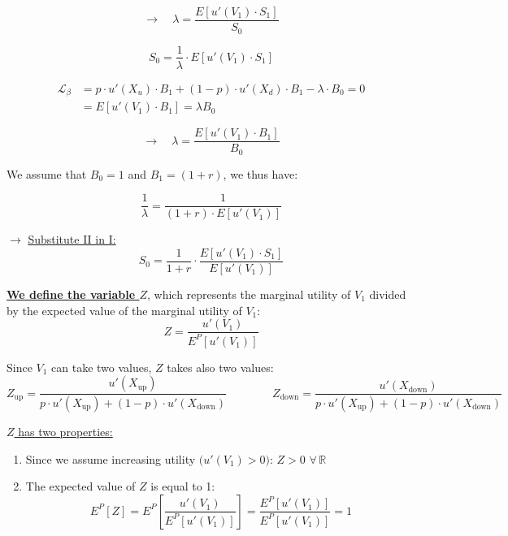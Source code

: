 \documentclass[12pt]{article}
\begin{document}
\[
\longrightarrow \quad
\lambda = \frac{E\!\left[u'(V_1) \cdot S_1\right]}{S_0}
\]

\[
S_0 = \frac{1}{\lambda} \cdot E\!\left[u'(V_1) \cdot S_1\right]
\]

\vspace{2em}

\begin{align*}
\mathcal{L}_\beta
  &= p \cdot u'(X_u) \cdot B_1 + (1-p) \cdot u'(X_d) \cdot B_1
     - \lambda \cdot B_0 = 0
  \tag{II} \\[4pt]
  &= E\!\left[u'(V_1) \cdot B_1\right] = \lambda B_0
\end{align*}

\[
\longrightarrow \quad
\lambda = \frac{E\!\left[u'(V_1) \cdot B_1\right]}{B_0}
\]

\vspace{2em}

\noindent We assume that $B_0 = 1$ and $B_1 = (1+r)$, we thus have:

\[
\frac{1}{\lambda}
  = \frac{1}{(1+r) \cdot E\!\left[u'(V_1)\right]}
\]
\vspace{2em}


\noindent$\longrightarrow$ \underline{Substitute II in I:}
\[
S_0 = \frac{1}{1+r} \cdot \frac{E\!\left[u'(V_1) \cdot S_1\right]}{E\!\left[u'(V_1)\right]}
\]

\vspace{1.5em}

\noindent \textbf{\underline{We define the variable $Z$}}, which represents the marginal utility of $V_1$ divided by the
expected value of the marginal utility of $V_1$:
\[
Z = \frac{u'(V_1)}{E^P\!\left[u'(V_1)\right]}
\]
\vspace{0.1em}

\noindent Since $V_1$ can take two values, $Z$ takes also two values:
\[
Z_{\text{up}} =
  \frac{u'(X_{\text{up}})}
       {p \cdot u'(X_{\text{up}}) + (1-p) \cdot u'(X_{\text{down}})}
\qquad\qquad
Z_{\text{down}} =
  \frac{u'(X_{\text{down}})}
       {p \cdot u'(X_{\text{up}}) + (1-p) \cdot u'(X_{\text{down}})}
\]

\vspace{1.5em}

\noindent\uline{$Z$ has two properties:}

\begin{enumerate}
  \item Since we assume increasing utility $\bigl(u'(V_1) > 0\bigr)$:
        \quad $Z > 0$ \quad $\forall\, \mathbb{R}$

  \vspace{0.6em}

  \item The expected value of $Z$ is equal to 1:
        \[
          E^P[Z]
          = E^P\!\left[\frac{u'(V_1)}{E^P\!\left[u'(V_1)\right]}\right]
          = \frac{E^P\!\left[u'(V_1)\right]}{E^P\!\left[u'(V_1)\right]}
          = 1
        \]
\end{enumerate}
\end{document}
